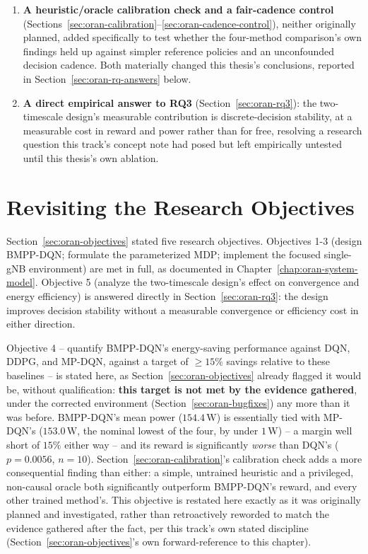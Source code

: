 \begin{enumerate}
  \item \textbf{A heuristic/oracle calibration check and a fair-cadence
    control} (Sections~\ref{sec:oran-calibration}--\ref{sec:oran-cadence-control}),
    neither originally planned, added specifically to test whether the
    four-method comparison's own findings held up against simpler
    reference policies and an unconfounded decision cadence. Both
    materially changed this thesis's conclusions, reported in
    Section~\ref{sec:oran-rq-answers} below.
  \item \textbf{A direct empirical answer to RQ3}
    (Section~\ref{sec:oran-rq3}): the two-timescale design's measurable
    contribution is discrete-decision stability, at a measurable cost in
    reward and power rather than for free, resolving a research question
    this track's concept note had posed but left empirically untested
    until this thesis's own ablation.
\end{enumerate}

\section{Revisiting the Research Objectives}
\label{sec:oran-revisit-objectives}

Section~\ref{sec:oran-objectives} stated five research objectives. Objectives
1-3 (design BMPP-DQN; formulate the parameterized MDP; implement the
focused single-gNB environment) are met in full, as documented in
Chapter~\ref{chap:oran-system-model}. Objective 5 (analyze the
two-timescale design's effect on convergence and energy efficiency) is
answered directly in Section~\ref{sec:oran-rq3}: the design improves
decision stability without a measurable convergence or efficiency cost in
either direction.

Objective 4 -- quantify BMPP-DQN's energy-saving performance against DQN,
DDPG, and MP-DQN, against a target of $\geq15\%$ savings relative to these
baselines -- is stated here, as Section~\ref{sec:oran-objectives} already
flagged it would be, without qualification: \textbf{this target is not met
by the evidence gathered}, under the corrected environment
(Section~\ref{sec:oran-bugfixes}) any more than it was before. BMPP-DQN's
mean power ($154.4\,\mathrm{W}$) is essentially tied with MP-DQN's
($153.0\,\mathrm{W}$, the nominal lowest of the four, by under
$1\,\mathrm{W}$) -- a margin well short of $15\%$ either way -- and its
reward is significantly \emph{worse} than DQN's ($p=0.0056$, $n=10$).
Section~\ref{sec:oran-calibration}'s calibration check adds a more
consequential finding than either: a simple, untrained heuristic and a
privileged, non-causal oracle both significantly outperform BMPP-DQN's
reward, and every other trained method's. This objective is restated
here exactly as it was originally planned and investigated, rather than
retroactively reworded to match the evidence gathered after the fact, per
this track's own stated discipline (Section~\ref{sec:oran-objectives}'s
own forward-reference to this chapter).

